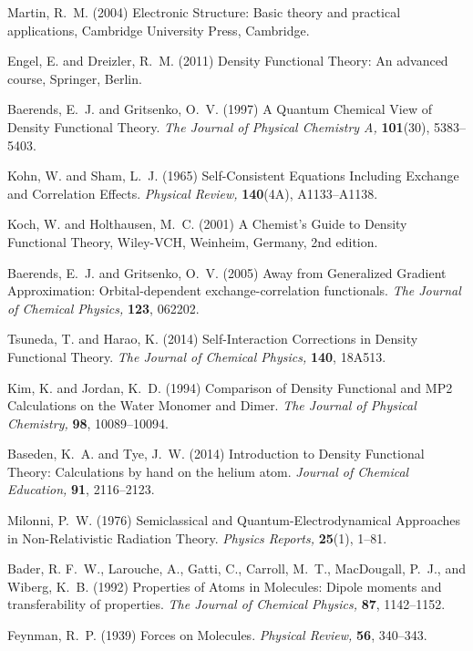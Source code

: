 \documentclass[onecolumn,secnumarabic,amsmath,amssymb,balancelastpage,nofootinbib]{article}
\begin{document}
\begin{thebibliography}{100}
Martin, R.~M. (2004)
Electronic Structure: Basic theory and practical applications,
Cambridge University Press, Cambridge.

Engel, E. and Dreizler, R.~M. (2011)
Density Functional Theory: An advanced course,
Springer, Berlin.

Baerends, E.~J. and Gritsenko, O.~V. (1997)
A Quantum Chemical View of Density Functional Theory.
{\em The Journal of Physical Chemistry A,} {\bf 101}(30), 5383--5403.

Kohn, W. and Sham, L.~J. (1965)
Self-Consistent Equations Including Exchange and Correlation Effects.
{\em Physical Review,} {\bf 140}(4A), A1133--A1138.

Koch, W. and Holthausen, M.~C. (2001)
A Chemist's Guide to Density Functional Theory,
Wiley-VCH, Weinheim, Germany, 2nd edition.

Baerends, E.~J. and Gritsenko, O.~V. (2005)
Away from Generalized Gradient Approximation: Orbital-dependent
  exchange-correlation functionals.
{\em The Journal of Chemical Physics,} {\bf 123}, 062202.

Tsuneda, T. and Harao, K. (2014)
Self-Interaction Corrections in Density Functional Theory.
{\em The Journal of Chemical Physics,} {\bf 140}, 18A513.

Kim, K. and Jordan, K.~D. (1994)
Comparison of Density Functional and MP2 Calculations on the Water Monomer and
  Dimer.
{\em The Journal of Physical Chemistry,} {\bf 98}, 10089--10094.

Baseden, K.~A. and Tye, J.~W. (2014)
Introduction to Density Functional Theory: Calculations by hand on the helium
  atom.
{\em Journal of Chemical Education,} {\bf 91}, 2116--2123.

Milonni, P.~W. (1976)
Semiclassical and Quantum-Electrodynamical Approaches in Non-Relativistic
  Radiation Theory.
{\em Physics Reports,} {\bf 25}(1), 1--81.

Bader, R. F.~W., Larouche, A., Gatti, C., Carroll, M.~T., MacDougall, P.~J.,
  and Wiberg, K.~B. (1992)
Properties of Atoms in Molecules: Dipole moments and transferability of
  properties.
{\em The Journal of Chemical Physics,} {\bf 87}, 1142--1152.

Feynman, R.~P. (1939)
Forces on Molecules.
{\em Physical Review,} {\bf 56}, 340--343.


\end{thebibliography}
\end{document}
